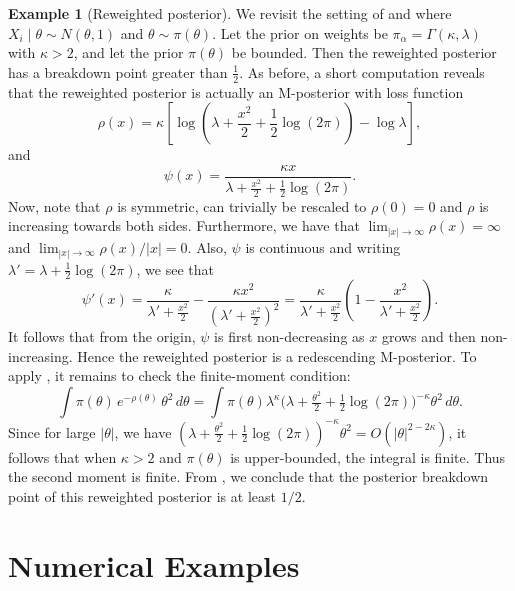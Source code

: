 \documentclass[11pt, oneside]{amsart}
\theoremstyle{definition}   %
\newtheorem{example}{Example}
\begin{document}
\begin{example}[Reweighted posterior] 
%
We revisit the setting of  and  where \( X_i \mid \theta \sim N(\theta, 1) \) and \( \theta \sim \pi(\theta) \). 
%
Let the prior on weights be \( \pi_\alpha = \Gamma(\kappa, \lambda) \) with \( \kappa > 2\), and let the prior \( \pi(\theta) \) be bounded. 
%
Then the reweighted posterior has a breakdown point greater than \( \frac{1}{2}. \)
%
As before, a short computation reveals that the reweighted posterior is actually an M-posterior with loss function
%
\[
    \rho (x) = \kappa \left [ \log \left ( \lambda + \frac{x ^ 2}{2} + \frac{1}{2} \log(2\pi) \right ) - \log \lambda \right ],
\]
%
and
%
\[
    \psi(x) = \frac{\kappa x}{\lambda + \frac{x^2}{2} + \frac{1}{2} \log(2\pi)}.
\]
%
Now, note that \( \rho \) is symmetric, can trivially be rescaled to \( \rho(0) = 0\) and \( \rho \) is increasing towards both sides. 
%
Furthermore, we have that \( \lim_{|x| \rightarrow \infty} \rho (x) = \infty\) and \( \lim_{|x| \rightarrow \infty} \rho (x) / |x| = 0. \) 
%
Also, \( \psi \) is continuous and writing \( \lambda' = \lambda + \tfrac{1}{2} \log(2\pi)\), we see that
%
\[
    \psi'(x) = \frac{\kappa}{\lambda' + \frac{x^2}{2}} - \frac{\kappa x^2}{(\lambda' + \frac{x^2}{2}) ^ 2} = \frac{\kappa}{\lambda' + \frac{x^2}{2}} \left ( 1 - \frac{x^2}{\lambda' + \frac{x^2}{2}}\right ).
\]
%
It follows that from the origin, \( \psi \) is first non-decreasing as \(x \) grows and then non-increasing. 
%
Hence the reweighted posterior is a redescending M-posterior. 
%
To apply , it remains to check the finite-moment condition:
%
\[
    \int \pi(\theta)\,e^{-\rho(\theta)}\,\theta^2\,d\theta
    = \int \pi(\theta) \lambda^\kappa \bigl(\lambda + \tfrac{\theta^2}{2} + \tfrac{1}{2} \log(2\pi)\bigr)^{-\kappa}\theta^2\,d\theta.
\]
%
Since for large $|\theta|$, we have $(\lambda + \tfrac{\theta^2}{2} + \frac{1}{2} \log(2\pi))^{-\kappa}\theta^2 = O(|\theta|^{2-2\kappa})$, it follows that when $\kappa>2$ and \( \pi(\theta)\) is upper-bounded, the integral is finite.  
%
Thus the second moment is finite.
%
From , we conclude that the posterior breakdown point of this reweighted posterior is at least \( 1/2\).
\end{example}
%
%
\section{Numerical Examples}
\label{sec::numerical-examples}
\end{document}
